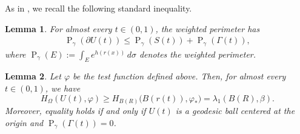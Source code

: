 \documentclass[11pt,leqno]{amsart}
\newtheorem{lemma}{Lemma}[section]
\numberwithin{equation}{section}
\begin{document}
As in \cite[Lemma 5.2]{BucurCV}, we recall the following standard inequality.
\begin{lemma}\label{lem:perimeter_decomposition}
For almost every $t \in (0,1)$, the weighted perimeter has 
\begin{align*}
\operatorname{P}_{\gamma}(\partial U(t)) \leq  \operatorname{P}_{\gamma}(S(t)) + \operatorname{P}_{\gamma}(\Gamma(t)),
\end{align*}
where $\operatorname{P}_{\gamma}(E) := \int_E e^{h(r(x))} \, d\sigma$ denotes the weighted perimeter.
\end{lemma}



\begin{lemma}\label{lem:Rayleigh_quotient_inequality}
Let $\varphi$ be the test function defined above. Then, for almost every $t \in (0,1)$, we have
\begin{equation}\label{eq:Rayleigh_step}
H_{\Omega}(U(t),\varphi) \geq H_{B(R)}\big(B(r(t)),\varphi_{*}\big) = \lambda_{1}(B(R),\beta).
\end{equation}
Moreover, equality holds if and only if $U(t)$ is a geodesic ball centered at the origin and $\operatorname{P}_{\gamma}(\Gamma(t))=0$.
\end{lemma}
\end{document}
